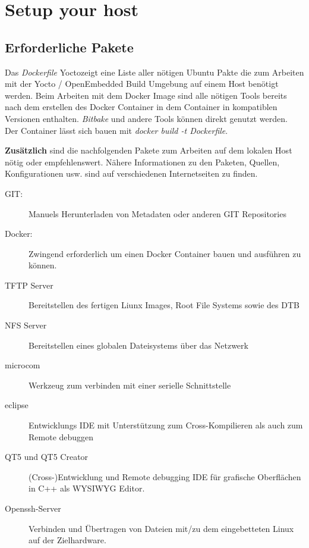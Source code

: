 \chapter{Setup your host}%
\label{cha:setup_host}


\section{Erforderliche Pakete}%
\label{sec:erforderliche_pakete}

Das \textit{\gls{Dockerfile}} \glqq Yocto\grqq zeigt eine Liste aller nötigen
Ubuntu Pakte die zum Arbeiten mit der Yocto / OpenEmbedded Build Umgebung auf
einem Host benötigt werden. Beim Arbeiten mit dem Docker Image sind alle nötigen
Tools bereits nach dem erstellen des Docker Container in dem Container in
kompatiblen Versionen  enthalten.  \textit{Bitbake} und andere Tools können
direkt genutzt werden.\\ Der Container lässt sich bauen mit \textit{docker build
-t Dockerfile}.

\textbf{Zusätzlich} sind die nachfolgenden Pakete zum Arbeiten auf dem lokalen
Host nötig oder empfehlenswert. Nähere Informationen zu den Paketen, Quellen,
Konfigurationen usw. sind auf verschiedenen Internetseiten zu finden.

\begin{description}
    \item [\gls{GIT}:] Manuels Herunterladen von Metadaten oder anderen GIT
        Repositories
    \item [Docker:] Zwingend erforderlich um einen Docker Container bauen und
        ausführen zu können.
    \item [\gls{TFTP} Server] Bereitstellen des fertigen Liunx Images, Root File
        Systems sowie des \acl{DTB}
    \item [\gls{NFS} Server] Bereitstellen eines globalen Dateisystems über das
        Netzwerk
    \item [microcom] Werkzeug zum verbinden mit einer serielle Schnittstelle
    \item [eclipse] Entwicklungs IDE mit Unterstützung zum Cross-Kompilieren als
        auch zum Remote debuggen
    \item [QT5 und QT5 Creator] (Cross-)Entwicklung und Remote debugging IDE für
        grafische Oberflächen in C++ als \ac{WYSIWYG} Editor.
    \item [Openssh-Server] Verbinden und Übertragen von Dateien mit/zu dem
        eingebetteten Linux auf der Zielhardware.
\end{description}

